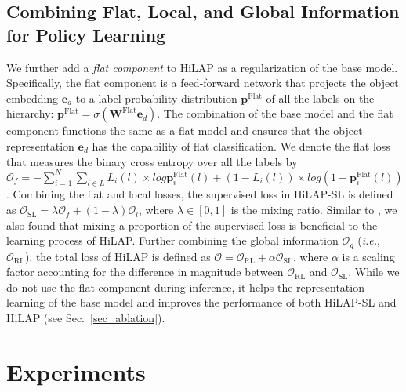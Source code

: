 \documentclass[11pt,a4paper]{article}
\newcommand{\ie}{\textit{i.e.}} \newcommand{\eg}{\textit{e.g.}}
\begin{document}
\subsection{Combining Flat, Local, and Global Information for Policy Learning}
\label{subsec_allThreeLoss}
We further add a \textit{flat component} to HiLAP as a regularization of the base model.
Specifically, the flat component is a feed-forward network that projects the object embedding $\textbf{e}_d$ to a label probability distribution $\textbf{p}^{\text{Flat}}$ of all the labels on the hierarchy: $\textbf{p}^{\text{Flat}} = \sigma (\textbf{W}^{\text{Flat}} \textbf{e}_d)$.
The combination of the base model and the flat component functions the same as a flat model and ensures that the object representation $\textbf{e}_d$ has the capability of flat classification.
We denote the flat loss that measures the binary cross entropy over all the labels by
$\mathcal{O}_{f} =  -\sum_{i=1}^N \sum_{l \in L}  L_i(l) \times  log \textbf{p}_i^{\text{Flat}}(l) + (1 - L_i(l))  \times log(1 - \textbf{p}_i^{\text{Flat}}(l))$.
Combining the flat and local losses, the supervised loss in HiLAP-SL is defined as $\mathcal{O}_{\text{SL}} = \lambda \mathcal{O}_f + (1 - \lambda) \mathcal{O}_l$, where $\lambda \in [0, 1]$ is the mixing ratio.
Similar to \citet{celikyilmaz2018deep}, we also found that mixing a proportion of the supervised loss is beneficial to the learning process of HiLAP. Further combining the global information $\mathcal{O}_{g}$ (\ie, $\mathcal{O}_{\text{RL}}$), the total loss of HiLAP is defined as $\mathcal{O} =  \mathcal{O}_{\text{RL}} + \alpha \mathcal{O}_{\text{SL}}$, where $\alpha$ is a scaling factor accounting for the difference in magnitude between $\mathcal{O}_{\text{RL}}$ and $\mathcal{O}_{\text{SL}}$.
While we do not use the flat component during inference, it helps the representation learning of the base model and improves the performance of both HiLAP-SL and HiLAP (see Sec.~\ref{sec_ablation}). 
\section{Experiments}
\end{document}
